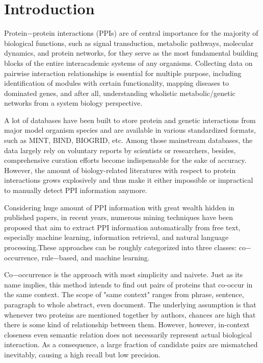 \section{Introduction}

Protein$-$protein interactions (PPIs) are of central importance for the majority of biological functions, such as signal transduction, metabolic pathways, molecular dynamics, and protein networks\cite{Hoffmann.Krallinger.ea:2005}, for they serve as the most fundamental building blocks of the entire interacademic systems of any organisms. Collecting data on pairwise interaction relationships is essential for multiple purpose, including identification of modules with certain functionality\cite{Spirin.Mirny.03}, mapping diseases to dominated genes\cite{Ideker.Sharan.08}, and after all, understanding wholistic metabolic/genetic networks from a system biology perspective.

A lot of databases have been built to store protein and genetic interactions from major model organism species and are available in various standardized formats, such as MINT\cite{Zanzoni.Montecchi-Palazzi.ea:2002}, BIND\cite{Bader.ea:2003}, BIOGRID\cite{DBLP:journals/nar/StarkBRBBT06}, etc. Among those mainstream databases, the data largely rely on voluntary reports by scientists or researchers, besides, comprehensive curation efforts become indispensable for the sake of accuracy. However, the amount of biology-related literatures with respect to protein interactions grows explosively and thus make it either impossible or impractical to manually detect PPI information anymore.

Considering huge amount of PPI information with great wealth hidden in published papers, in recent years, numerous mining techniques have been proposed that aim to extract PPI information automatically from free text, especially machine learning, information retrieval, and natural language processing\cite{DBLP:journals/bib/WinnenburgWPDS08}.These approaches can be roughly categorized into three classes: co$-$occurrence, rule$-$based, and machine learning. 

Co$-$occurrence is the approach with most simplicity and naivete. Just as its name implies, this method intends to find out pairs of proteins that co-occur in the same context. The scope of "same context" ranges from phrase, sentence, paragraph to whole abstract, even document. The underlying assumption is that whenever two proteins are mentioned together by authors, chances are high that there is some kind of relationship between them. However, however, in-context closeness even semantic relation does not necessarily represent actual biological interaction. As a consequence, a large fraction of candidate pairs are mismatched inevitably, causing a high recall but low precision.

